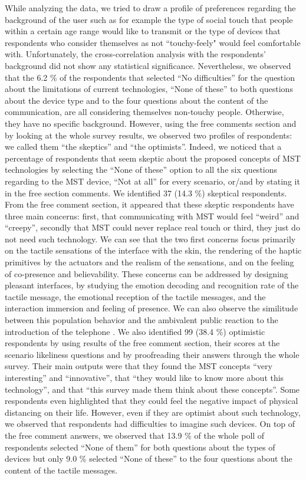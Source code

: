 \documentclass[acmsmall]{acmart}
\begin{document}
While analyzing the data, we tried to draw a profile of preferences regarding the background of the user such as for example the type of social touch that people within a certain age range would like to transmit or the type of devices that respondents who consider themselves as not “touchy-feely" would feel comfortable with. Unfortunately, the cross-correlation analysis with the respondents’ background did not show any statistical significance. Nevertheless, we observed that the 6.2 \% of the respondents that selected “No difficulties” for the question about the limitations of current technologies, “None of these” to both questions about the device type and to the four questions about the content of the communication, are all considering themselves non-touchy people. Otherwise, they have no specific background.
However, using the free comments section and by looking at the whole survey results, we observed two profiles of respondents: we called them “the skeptics” and “the optimists”. Indeed, we noticed that a percentage of respondents that seem skeptic about the proposed concepts of MST technologies by selecting the “None of these” option to all the six questions regarding to the MST device, “Not at all” for every scenario, or/and by stating it in the free section comments. We identified 37 (14.3 \%) skeptical respondents. From the free comment section, it appeared that these skeptic respondents have three main concerns: first, that communicating with MST would feel “weird” and “creepy”, secondly that MST could never replace real touch or third, they just do not need such technology. We can see that the two first concerns focus primarily on the tactile sensations of the interface with the skin, the rendering of the haptic primitives by the actuators and the realism of the sensations, and on the feeling of co-presence and believability. These concerns can be addressed by designing pleasant interfaces, by studying the emotion decoding and recognition rate of the tactile message, the emotional reception of the tactile messages, and the interaction immersion and feeling of presence. We can also observe the similitude between this population behavior and the ambivalent public reaction to the introduction of the telephone \cite{fischer1992america}.
We also identified 99 (38.4 \%) optimistic respondents by using results of the free comment section, their scores at the scenario likeliness questions and by proofreading their answers through the whole survey. Their main outputs were that they found the MST concepts ``very interesting'' and ``innovative'', that ``they would like to know more about this technology'', and that ``this survey made them think about these concepts''. Some respondents even highlighted that they could feel the negative impact of physical distancing on their life. However, even if they are optimist about such technology, we observed that respondents had difficulties to imagine such devices. On top of the free comment answers, we observed that 13.9 \% of the whole poll of respondents selected “None of them” for both questions about the types of devices but only 9.0 \% selected “None of these” to the four questions about the content of the tactile messages.
\end{document}
